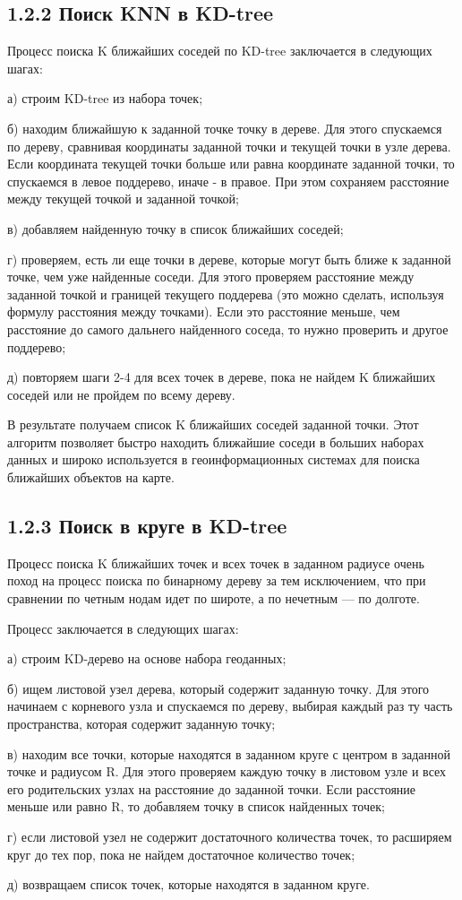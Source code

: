 \subsection{1.2.2 Поиск KNN в KD-tree}

Процесс поиска K ближайших соседей по KD-tree заключается в следующих шагах:
\par а) строим KD-tree из набора точек;
\par б) находим ближайшую к заданной точке точку в дереве. Для этого спускаемся по дереву, сравнивая координаты заданной точки и текущей точки в узле дерева. Если координата текущей точки больше или равна координате заданной точки, то спускаемся в левое поддерево, иначе - в правое. При этом сохраняем расстояние между текущей точкой и заданной точкой;
\par в) добавляем найденную точку в список ближайших соседей;
\par г) проверяем, есть ли еще точки в дереве, которые могут быть ближе к заданной точке, чем уже найденные соседи. Для этого проверяем расстояние между заданной точкой и границей текущего поддерева (это можно сделать, используя формулу расстояния между точками). Если это расстояние меньше, чем расстояние до самого дальнего найденного соседа, то нужно проверить и другое поддерево;
\par д) повторяем шаги 2-4 для всех точек в дереве, пока не найдем K ближайших соседей или не пройдем по всему дереву.

В результате получаем список K ближайших соседей заданной точки. Этот алгоритм позволяет быстро находить ближайшие соседи в больших наборах данных и широко используется в геоинформационных системах для поиска ближайших объектов на карте.

\subsection{1.2.3 Поиск в круге в KD-tree}
Процесс поиска K ближайших точек и всех точек в заданном радиусе очень поход на процесс поиска по бинарному дереву за тем исключением, что при сравнении по четным нодам идет по широте, а по нечетным — по долготе. 

Процесс заключается в следующих шагах:
\par а) строим KD-дерево на основе набора геоданных;
\par б) ищем листовой узел дерева, который содержит заданную точку. Для этого начинаем с корневого узла и спускаемся по дереву, выбирая каждый раз ту часть пространства, которая содержит заданную точку;
\par в) находим все точки, которые находятся в заданном круге с центром в заданной точке и радиусом R. Для этого проверяем каждую точку в листовом узле и всех его родительских узлах на расстояние до заданной точки. Если расстояние меньше или равно R, то добавляем точку в список найденных точек;
\par г) если листовой узел не содержит достаточного количества точек, то расширяем круг до тех пор, пока не найдем достаточное количество точек;
\par д) возвращаем список точек, которые находятся в заданном круге.


